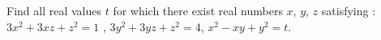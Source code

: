 Find all real values $t$ for which there exist real numbers $x$, $y$, $z$ satisfying :
$3x^2 + 3xz + z^2 = 1$ ,
$3y^2 + 3yz + z^2 = 4$,
$x^2 - xy + y^2 = t$.